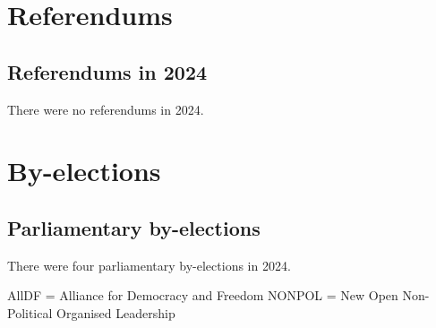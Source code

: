 \documentclass[a4paper,openany]{book}
\begin{document}



\part{Referendums}

\chapter{Referendums in 2024}

There were no referendums in 2024.




\part{By-elections}

\chapter{Parliamentary by-elections}

There were four parliamentary by-elections in 2024.


AllDF = Alliance for Democracy and Freedom
%
%
%
%
%
%
%
%
NONPOL = New Open Non-Political Organised Leadership

%
%
%
%
%
%
\end{document}
